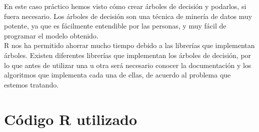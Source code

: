 \documentclass[12pt,a4paper,twoside,openright,titlepage,final]{article}
\begin{document}
En este caso práctico hemos visto cómo crear árboles de decisión y podarlos, si fuera necesario. Los árboles de decisión son una técnica de minería de datos muy potente, ya que es fácilmente entendible por las personas, y muy fácil de programar el modelo obtenido.\\

R nos ha permitido ahorrar mucho tiempo debido a las librerías que implementan árboles. Existen diferentes librerías que implementan los árboles de decisión, por lo que antes de utilizar una u otra será necesario conocer la documentación y los algoritmos que implementa cada una de ellas, de acuerdo al problema que estemos tratando. 

\clearpage

\section{Código R utilizado}


\end{document}
